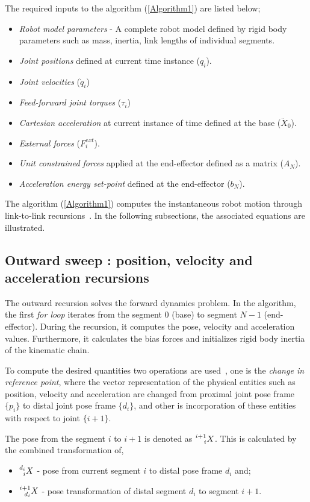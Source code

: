 The required inputs to the algorithm (\ref{Algorithm1}) are listed below;
\begin{itemize}
	\item \textit{Robot model parameters} - A complete robot model defined by rigid body parameters such as mass, inertia, link lengths of individual segments.
	\item \textit{Joint positions} defined at current time instance ($q_i$).
	\item \textit{Joint velocities} ($\dot{q}_i$)
	\item \textit{Feed-forward joint torques} ($\tau_i$)
	\item \textit{Cartesian acceleration} at current instance of time defined at the base ($\ddot{X}_0$).
	\item \textit{External forces} ($F^{ext}_i$).
	\item \textit{Unit constrained forces} applied at the end-effector defined as a matrix ($A_N$).
	\item \textit{Acceleration energy set-point} defined at the end-effector ($b_N$).
\end{itemize}

The algorithm (\ref{Algorithm1}) computes the instantaneous robot motion through link-to-link recursions~\cite{shakhimardanov2015composable}. In the following subsections, the associated equations are illustrated.

\subsection{Outward sweep : position, velocity and acceleration recursions}
The outward recursion solves the forward dynamics problem. In the algorithm, the first \textit{for loop} iterates from the segment $0$ (base) to segment $N-1$ (end-effector). During the recursion, it computes the pose, velocity and acceleration values. Furthermore, it calculates the bias forces and initializes rigid body inertia of the kinematic chain. 

To compute the desired quantities two operations are used~\cite{shakhimardanov2015composable}, one is the \textit{change in reference point}, where the vector representation of the physical entities such as position, velocity and acceleration are changed from proximal joint pose frame $\{p_i\}$ to distal joint pose frame $\{d_i\}$, and other is incorporation of these entities with respect to joint $\{i+1\}$.

The pose from the segment $i$ to $i+1$ is denoted as $\prescript{i+1}{i}{X}$. This is calculated by the combined transformation of,\begin{itemize}
	\item $\prescript{d_i}{i}{X}$ - pose from current segment $i$ to distal pose frame $d_i$ and;
	\item $\prescript{i+1}{d_i}{X}$ - pose transformation of distal segment $d_i$ to segment $i+1$. 
\end{itemize} 

